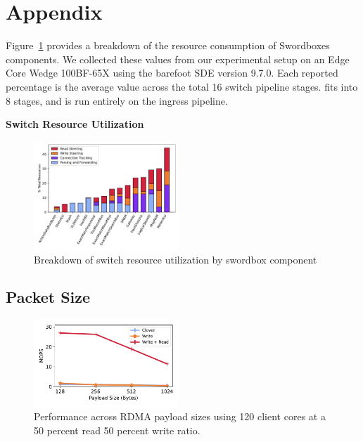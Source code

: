 \section{Appendix}

Figure~\ref{fig:switch_resources} provides a breakdown of the resource
consumption of Swordboxes components. We collected these values from our
experimental setup on an Edge Core Wedge 100BF-65X using the barefoot SDE
version 9.7.0. Each reported percentage is the average value across the total 16
switch pipeline stages. {\sword} fits into 8 stages, and is run entirely on the
ingress pipeline.

\textbf{Switch Resource Utilization}
\begin{figure}[t]
    \includegraphics[width=0.485\textwidth]{fig/switch_resources.pdf}
    \caption{Breakdown of switch resource utilization by swordbox component}
    \label{fig:switch_resources}
\end{figure}

\subsection{Packet Size}

\begin{figure}
  \centering
  \includegraphics[width=0.485\textwidth]{fig/packet_size.pdf}

    \caption{Performance across RDMA payload sizes using 120 client cores at a 50 percent read 50 percent write ratio.}

    \label{fig:packet_size}
\end{figure}

